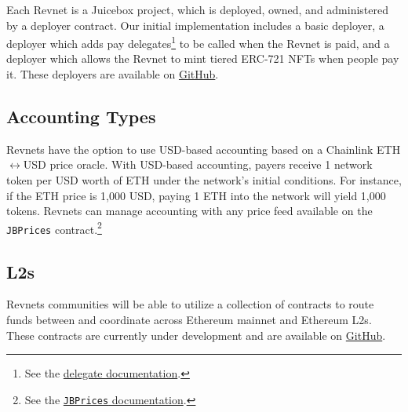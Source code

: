 \documentclass{article}
\begin{document}
Each Revnet is a Juicebox project, which is deployed, owned, and administered by a deployer contract. Our initial implementation includes a basic deployer, a deployer which adds pay delegates\footnote{See the \href{https://docs.juicebox.money/dev/learn/glossary/delegate/}{delegate documentation}.} to be called when the Revnet is paid, and a deployer which allows the Revnet to mint tiered ERC-721 NFTs when people pay it. These deployers are available on \href{https://github.com/mejango/retailism-templates}{GitHub}.

\subsection{Accounting Types}\label{sec:accounting_types}

Revnets have the option to use USD-based accounting based on a Chainlink ETH$\leftrightarrow$USD price oracle. With USD-based accounting, payers receive 1 network token per USD worth of ETH under the network's initial conditions. For instance, if the ETH price is 1,000 USD, paying 1 ETH into the network will yield 1,000 tokens. Revnets can manage accounting with any price feed available on the \texttt{JBPrices} contract.\footnote{See the \href{https://docs.juicebox.money/dev/api/contracts/jbprices/}{\texttt{JBPrices} documentation}.}

\subsection{L2s}

Revnets communities will be able to utilize a collection of contracts to route funds between and coordinate across Ethereum mainnet and Ethereum L2s. These contracts are currently under development and are available on \href{https://github.com/Bananapus}{GitHub}.
\end{document}
